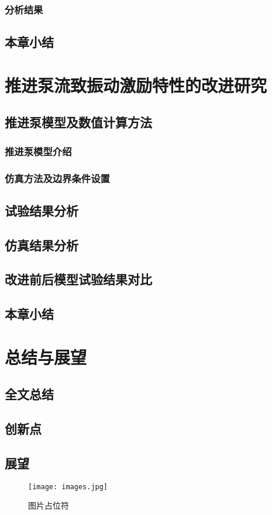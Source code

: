 \subsection{分析结果}
\section{本章小结}

\chapter{推进泵流致振动激励特性的改进研究}
\section{推进泵模型及数值计算方法}
\subsection{推进泵模型介绍}
\subsection{仿真方法及边界条件设置}
\section{试验结果分析}
\section{仿真结果分析}
\section{改进前后模型试验结果对比}
\section{本章小结}

\chapter{总结与展望}
\section{全文总结}
\section{创新点}
\section{展望}


\begin{figure}[htbp]
    \centering
    \texttt{[image: images.jpg]}
    \caption{\label{fig:fig-placeholder}图片占位符}
\end{figure}